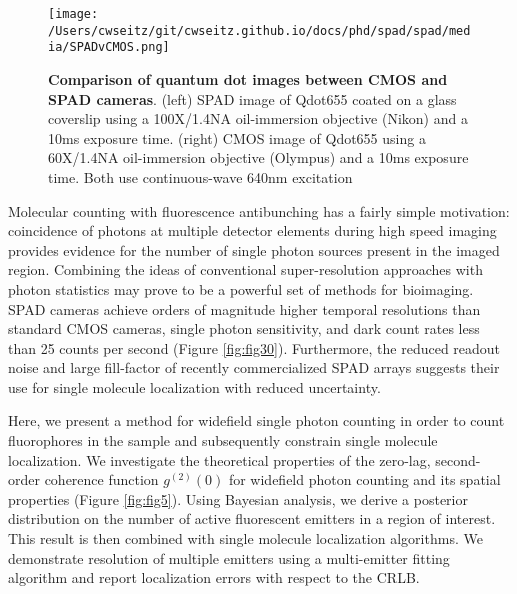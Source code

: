 


\begin{figure*}[t]
\centering
\texttt{[image: /Users/cwseitz/git/cwseitz.github.io/docs/phd/spad/spad/media/SPADvCMOS.png]}
\caption{\textbf{Comparison of quantum dot images between CMOS and SPAD cameras}. (left) SPAD image of Qdot655 coated on a glass coverslip using a 100X/1.4NA oil-immersion objective (Nikon) and a 10ms exposure time. (right) CMOS image of Qdot655 using a 60X/1.4NA oil-immersion objective (Olympus) and a 10ms exposure time. Both use continuous-wave 640nm excitation}
\label{fig:fig4}
\end{figure*}    

Molecular counting with fluorescence antibunching has a fairly simple motivation: coincidence of photons at multiple detector elements during high speed imaging provides evidence for the number of single photon sources present in the imaged region. Combining the ideas of conventional super-resolution approaches with photon statistics may prove to be a powerful set of methods for bioimaging. SPAD cameras achieve orders of magnitude higher temporal resolutions than standard CMOS cameras, single photon sensitivity, and dark count rates less than 25 counts per second (Figure \ref{fig:fig30}). Furthermore, the reduced readout noise and large fill-factor of recently commercialized SPAD arrays suggests their use for single molecule localization with reduced uncertainty.

Here, we present a method for widefield single photon counting in order to count fluorophores in the sample and subsequently constrain single molecule localization. We investigate the theoretical properties of the zero-lag, second-order coherence function $g^{(2)}(0)$ for widefield photon counting and its spatial properties (Figure \ref{fig:fig5}). Using Bayesian analysis, we derive a posterior distribution on the number of active fluorescent emitters in a region of interest. This result is then combined with single molecule localization algorithms.  We demonstrate resolution of multiple emitters using a multi-emitter fitting algorithm and report localization errors with respect to the CRLB.

